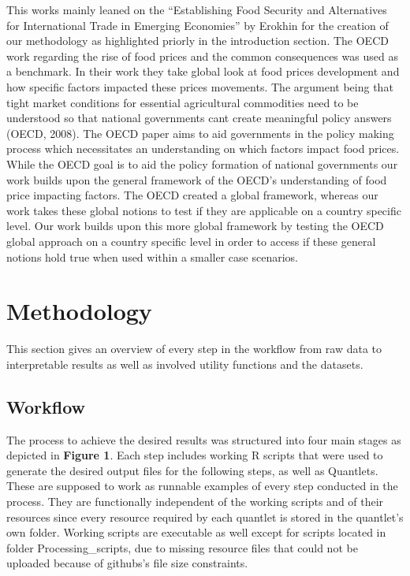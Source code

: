 \documentclass[12pt,a4paper,english]{article}
\begin{document}
This works mainly leaned on the “Establishing Food Security and Alternatives for International Trade in Emerging Economies” by Erokhin for the creation of our methodology as highlighted priorly in the introduction section. 
The OECD work regarding the rise of food prices and the common consequences was used as a benchmark. In their work they take global look at food prices development and how specific factors impacted these prices movements. The argument being that tight market conditions for essential agricultural commodities need to be understood so that national governments cant create meaningful policy answers (OECD, 2008). The OECD paper aims to aid governments in the policy making process which necessitates an understanding on which factors impact food prices. While the OECD goal is to aid the  policy formation of national governments our work builds upon the general framework of the OECD’s understanding of food price impacting factors. The OECD created a global framework, whereas our work takes these global notions to test if they are applicable on a country specific level. Our work builds upon this more global framework by testing the OECD global approach on a country specific level in order to access if these general notions hold true when used within a smaller case scenarios.


\section{Methodology}

This section gives an overview of every step in the workflow from raw data to interpretable results as well as involved utility functions and the datasets.

\subsection{Workflow}

The process to achieve the desired results was structured into four main stages as depicted in \textbf{Figure 1}. Each step includes working R scripts that were used to generate the desired output files for the following steps, as well as Quantlets. These are supposed to work as runnable examples of every step conducted in the process. They are functionally independent of the working scripts and of their resources since every resource required by each quantlet is stored in the quantlet’s own folder.
Working scripts are executable as well except for scripts located in folder Processing\_scripts, due to missing resource files that could not be uploaded because of githubs’s file size constraints.
\end{document}
